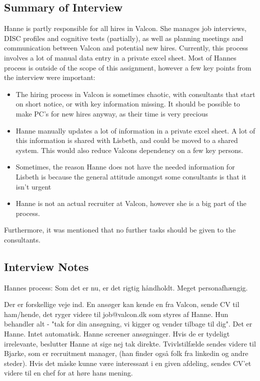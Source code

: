 \label{app:hanne_interview}
\begin{linenumbers*}
\subsection{Summary of Interview}
Hanne is partly responsible for all hires in Valcon. She manages job interviews, DISC profiles and cognitive tests (partially), as well as planning meetings and communication between Valcon and potential new hires. \newline
Currently, this process involves a lot of manual data entry in a private excel sheet. 
Most of Hannes process is outside of the scope of this assignment, however a few key points from the interview were important:
\begin{itemize}
	\item{The hiring process in Valcon is sometimes chaotic, with consultants that start on short notice, or with key information missing. It should be possible to make PC's for new hires anyway, as their time is very precious}
	\item{Hanne manually updates a lot of information in a private excel sheet. A lot of this information is shared with Lisbeth, and could be moved to a shared system. This would also reduce Valcons dependency on a few key persons.}
	\item{Sometimes, the reason Hanne does not have the needed information for Lisbeth is because the general attitude amongst some consultants is that it isn't urgent}
	\item Hanne is not an actual recruiter at Valcon, however she is a big part of the process.
\end{itemize}
Furthermore, it was mentioned that no further tasks should be given to the consultants.

\subsection{Interview Notes}
Hannes process:
Som det er nu, er det rigtig håndholdt. Meget personafhængig. 

Der er forskellige veje ind. En ansøger kan kende en fra Valcon, sende CV til ham/hende, det ryger videre til job@valcon.dk som styres af Hanne.
Hun behandler alt - "tak for din ansøgning, vi kigger og vender tilbage til dig". Det er Hanne. Intet automatisk.
Hanne screener ansøgninger. Hvis de er tydeligt irrelevante, beslutter Hanne at sige nej tak direkte. Tvivlstilfælde sendes videre til Bjarke, som er recruitment manager, (han finder også folk fra linkedin og andre steder).
Hvis det måske kunne være interessant i en given afdeling, sendes CV'et videre til en chef for at høre hans mening. 


\end{linenumbers*}
